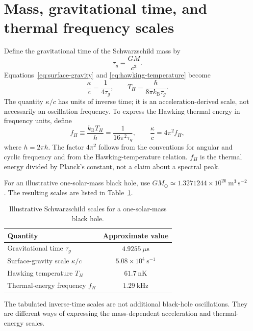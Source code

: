 \documentclass[12pt]{article}
\begin{document}
\section{Mass, gravitational time, and thermal frequency scales}

Define the gravitational time of the Schwarzschild mass by
\begin{equation}
  \tau_g\equiv\frac{GM}{c^3}.
  \label{eq:gravitational-time}
\end{equation}
Equations~\eqref{eq:surface-gravity} and \eqref{eq:hawking-temperature} become
\begin{equation}
  \frac{\kappa}{c}=\frac{1}{4\tau_g},
  \qquad
  T_H=\frac{\hbar}{8\pi k_{\mathrm B}\tau_g}.
  \label{eq:mass-time-temperature}
\end{equation}
The quantity $\kappa/c$ has units of inverse time; it is an acceleration-derived scale, not necessarily an oscillation frequency. To express the Hawking thermal energy in frequency units, define
\begin{equation}
  f_H\equiv\frac{k_{\mathrm B}T_H}{h}
  =\frac{1}{16\pi^2\tau_g},
  \qquad
  \frac{\kappa}{c}=4\pi^2f_H,
  \label{eq:thermal-frequency}
\end{equation}
where $h=2\pi\hbar$. The factor $4\pi^2$ follows from the conventions for angular and cyclic frequency and from the Hawking-temperature relation. $f_H$ is the thermal energy divided by Planck's constant, not a claim about a spectral peak.

For an illustrative one-solar-mass black hole, use $GM_\odot\simeq1.3271244\times10^{20}\ \mathrm{m^3\,s^{-2}}$ \cite{JPL}. The resulting scales are listed in Table~\ref{tab:solar-mass-scales}.
\begin{table}[ht]
  \centering
  \caption{Illustrative Schwarzschild scales for a one-solar-mass black hole.}
  \label{tab:solar-mass-scales}
  \begin{tabular}{lc}
    \toprule
    Quantity & Approximate value \\
    \midrule
    Gravitational time $\tau_g$ & $4.9255\ \mu\mathrm{s}$ \\
    Surface-gravity scale $\kappa/c$ & $5.08\times10^4\ \mathrm{s^{-1}}$ \\
    Hawking temperature $T_H$ & $61.7\ \mathrm{nK}$ \\
    Thermal-energy frequency $f_H$ & $1.29\ \mathrm{kHz}$ \\
    \bottomrule
  \end{tabular}
\end{table}
The tabulated inverse-time scales are not additional black-hole oscillations. They are different ways of expressing the mass-dependent acceleration and thermal-energy scales.
\end{document}

